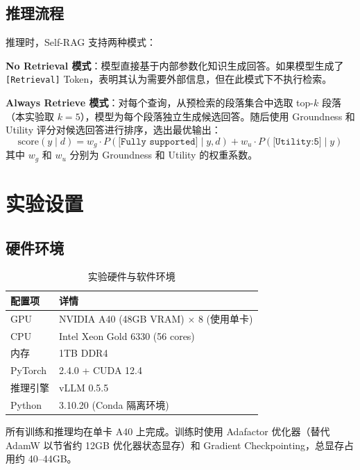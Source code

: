 \documentclass[11pt,a4paper]{article}
\begin{document}
\subsection{推理流程}
\label{sec:inference}

推理时，Self-RAG 支持两种模式：

\textbf{No Retrieval 模式}：模型直接基于内部参数化知识生成回答。如果模型生成了 \texttt{[Retrieval]} Token，表明其认为需要外部信息，但在此模式下不执行检索。

\textbf{Always Retrieve 模式}：对每个查询，从预检索的段落集合中选取 top-$k$ 段落（本实验取 $k=5$），模型为每个段落独立生成候选回答。随后使用 Groundness 和 Utility 评分对候选回答进行排序，选出最优输出：
\begin{equation}
\text{score}(y \mid d) = w_g \cdot P(\texttt{[Fully supported]} \mid y, d) + w_u \cdot P(\texttt{[Utility:5]} \mid y)
\end{equation}
其中 $w_g$ 和 $w_u$ 分别为 Groundness 和 Utility 的权重系数。

\section{实验设置}
\label{sec:setup}

\subsection{硬件环境}

\begin{table}[H]
\centering
\caption{实验硬件与软件环境}
\begin{tabular}{ll}
\toprule
配置项 & 详情 \\
\midrule
GPU & NVIDIA A40 (48GB VRAM) $\times$ 8 (使用单卡) \\
CPU & Intel Xeon Gold 6330 (56 cores) \\
内存 & 1TB DDR4 \\
PyTorch & 2.4.0 + CUDA 12.4 \\
推理引擎 & vLLM 0.5.5 \\
Python & 3.10.20 (Conda 隔离环境) \\
\bottomrule
\end{tabular}
\end{table}

所有训练和推理均在单卡 A40 上完成。训练时使用 Adafactor 优化器（替代 AdamW 以节省约 12GB 优化器状态显存）和 Gradient Checkpointing，总显存占用约 40--44GB。
\end{document}
